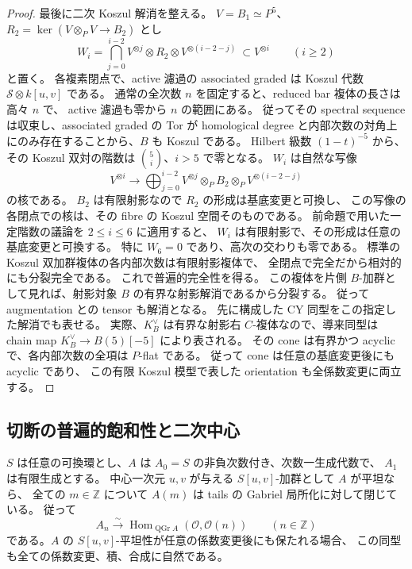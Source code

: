 \begin{proof}
最後に二次 Koszul 解消を整える。
$V=B_1\simeq P^5$、$R_2=\ker(V\otimes_PV\to B_2)$ とし
\[
 W_i=\bigcap_{j=0}^{i-2}
 V^{\otimes j}\otimes R_2\otimes V^{\otimes(i-2-j)}
 \ \subset V^{\otimes i}\qquad(i\geq2)
\]
と置く。
各複素閉点で、active 濾過の associated graded は
Koszul 代数 $\mathscr S\otimes k[u,v]$ である。
通常の全次数 $n$ を固定すると、reduced bar 複体の長さは高々 $n$ で、
active 濾過も零から $n$ の範囲にある。
従ってその spectral sequence は収束し、associated graded の Tor が
homological degree と内部次数の対角上にのみ存在することから、$B$ も Koszul である。
Hilbert 級数 $(1-t)^{-5}$ から、その Koszul 双対の階数は
$\binom5i$、$i>5$ で零となる。
$W_i$ は自然な写像
\[
 V^{\otimes i}\longrightarrow
 \bigoplus_{j=0}^{i-2}
 V^{\otimes j}\otimes_P B_2\otimes_P V^{\otimes(i-2-j)}
\]
の核である。
$B_2$ は有限射影なので $R_2$ の形成は基底変更と可換し、
この写像の各閉点での核は、その fibre の Koszul 空間そのものである。
前命題で用いた一定階数の議論を $2\leq i\leq6$ に適用すると、
$W_i$ は有限射影で、その形成は任意の基底変更と可換する。
特に $W_6=0$ であり、高次の交わりも零である。
標準の Koszul 双加群複体の各内部次数は有限射影複体で、
全閉点で完全だから相対的にも分裂完全である。
これで普遍的完全性を得る。
この複体を片側 $B$-加群として見れば、射影対象 $B$ の有界な射影解消であるから分裂する。
従って augmentation との tensor も解消となる。
先に構成した CY 同型をこの指定した解消でも表せる。
実際、$K_B^\vee$ は有界な射影右 $C$-複体なので、導来同型は chain map
$K_B^\vee\to B(5)[-5]$ により表される。
その cone は有界かつ acyclic で、各内部次数の全項は $P$-flat である。
従って cone は任意の基底変更後にも acyclic であり、
この有限 Koszul 模型で表した orientation も全係数変更に両立する。
\end{proof}

\subsection{切断の普遍的飽和性と二次中心}

\begin{lemma}[中心二変数による飽和性]
\label{lem:two-central-variables-universal-saturation}
$S$ は任意の可換環とし、$A$ は $A_0=S$ の非負次数付き、次数一生成代数で、
$A_1$ は有限生成とする。
中心一次元 $u,v$ が与える $S[u,v]$-加群として $A$ が平坦なら、
全ての $m\in\mathbb Z$ について $A(m)$ は tails の Gabriel 局所化に対して閉じている。
従って
\[
 A_n\xrightarrow{\sim}
 \operatorname{Hom}_{\operatorname{QGr}A}(\mathcal O,\mathcal O(n))
 \qquad(n\in\mathbb Z)
\]
である。$A$ の $S[u,v]$-平坦性が任意の係数変更後にも保たれる場合、
この同型も全ての係数変更、積、合成に自然である。
\end{lemma}

